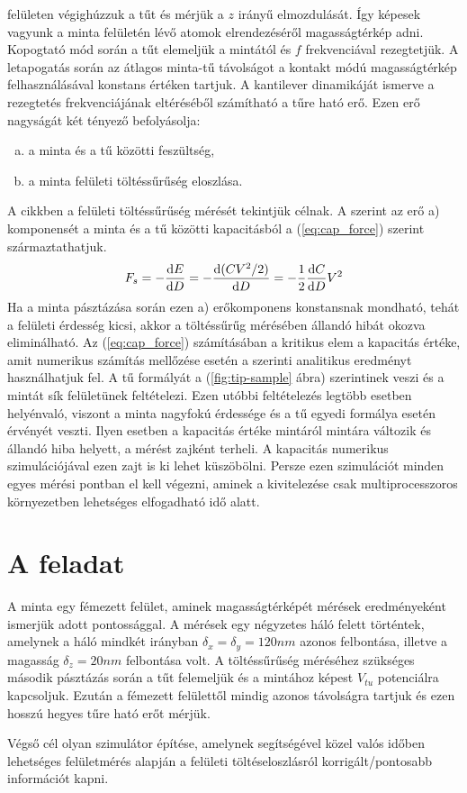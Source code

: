 	felületen végighúzzuk a tűt és mérjük a $z$ irányű elmozdulását. Így képesek vagyunk a minta
	felületén lévő atomok elrendezéséről magasságtérkép adni.
	Kopogtató mód \cite{Martin1987} során a tűt elemeljük a mintától és $f$ frekvenciával rezegtetjük.
	A letapogatás során az  átlagos minta-tű távolságot a kontakt módú magasságtérkép felhasználásával
	konstans értéken tartjuk.
	A kantilever dinamikáját ismerve a rezegtetés frekvenciájának eltéréséből
	számítható a tűre ható erő. Ezen erő nagyságát két tényező befolyásolja:
	\begin{enumerate}[a)]
		\item a minta és a tű közötti feszültség,
		\item a minta felületi töltéssűrűség eloszlása.
	\end{enumerate}
	A cikkben a felületi töltéssűrűség mérését tekintjük célnak.
	A \cite{Butt20051} szerint az erő a) komponensét a minta és a tű közötti kapacitásból a
	(\ref{eq:cap_force}) szerint származtathatjuk.
	\begin{equation}
	\label{eq:cap_force}
	F_{s} = -\frac{\ud E}{\ud D} = -\frac{\ud (CV^2 /2)}{\ud D} = -\frac12 \frac{\ud C}{\ud D} V^2
	\end{equation}
	Ha a minta pásztázása során ezen a) erőkomponens konstansnak mondható, tehát a felületi
	érdesség kicsi, akkor a töltéssűrűg mérésében állandó hibát okozva eliminálható.
	Az (\ref{eq:cap_force}) számításában a kritikus elem a kapacitás értéke, amit numerikus számítás
	mellőzése esetén a \cite{Hudlet1998} szerinti analitikus eredményt használhatjuk fel.
	A tű formályát a (\ref{fig:tip-sample} ábra) szerintinek veszi és a mintát sík felületünek
	feltételezi.
	Ezen utóbbi feltételezés legtöbb esetben helyénvaló, viszont a minta nagyfokú érdessége és a
	tű egyedi formálya esetén érvényét veszti. Ilyen esetben a kapacitás értéke mintáról
	mintára változik és állandó hiba helyett, a mérést zajként terheli.
	A kapacitás numerikus szimulációjával ezen zajt is ki lehet küszöbölni.
	Persze ezen szimulációt minden egyes mérési pontban el kell végezni, aminek a kivitelezése
	csak multiprocesszoros környezetben lehetséges elfogadható idő alatt.
	
\section{A feladat}
	A minta egy fémezett felület, aminek magasságtérképét mérések eredményeként ismerjük
	adott pontossággal.
	A mérések egy négyzetes háló felett történtek, amelynek a háló mindkét irányban
	$\delta_x = \delta_y = 120 nm$ azonos felbontása, illetve a magasság $\delta_z = 20nm$ felbontása
	volt.
	A töltéssűrűség méréséhez szükséges második pásztázás során a tűt felemeljük és a mintához képest
	$V_{tu}$ potenciálra kapcsoljuk. Ezután a fémezett felülettől mindig azonos távolságra tartjuk és ezen 
	hosszú hegyes tűre ható erőt mérjük.
	\noindent
	\begin{center}
	Végső cél olyan szimulátor építése, amelynek segítségével közel valós időben 
	lehetséges felületmérés alapján a felületi töltéseloszlásról korrigált/pontosabb információt
	kapni.
	\end{center}
	
